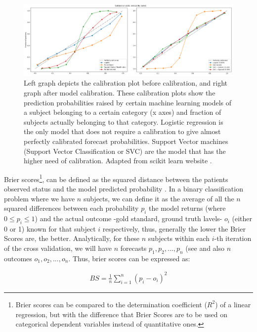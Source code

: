 \documentclass[a4paper,12pt]{elsarticle}  %
\begin{document}
\begin{figure}[h] 
	\centering	
	\includegraphics[width=\textwidth]{fig_calibration_vs_no_calibration.png}	
	\caption{Left graph depicts the calibration plot before calibration, and right graph after model calibration. These calibration plots show the prediction probabilities raised by certain machine learning models of a subject belonging to a certain category (x axes) and fraction of subjects actually belonging to that category. Logistic regression is the only model that does not require a calibration to give almost perfectly calibrated forecast probabilities. Support Vector machines (Support Vector Classification or SVC) are the model that has the higher need of calibration. Adapted from scikit learn website \cite{sklearn-calibration}.}
	\label{fig:calibration_vs_no_calibration}
\end{figure}

Brier scores\footnote{Brier scores can  be compared to the determination coefficient ($R^{2}$) of a linear regression, but with the difference that Brier Scores are to be used on categorical dependent variables instead of quantitative ones.}, can be defined as the squared distance between the patients observed status and the model predicted probability \cite{Gerds2008457}. In a binary classification problem where we have $n$ subjects, we can define it as the average of all the $n$ squared differences between each probability $p_i$ the model returns (where $0 \le p_i \le 1$) and the actual outcome -gold standard, ground truth lavels- $o_i$ (either 0 or 1) known for that subject $i$ respectively, thus, generally the lower the Brier Scores are, the better. Analytically, for these $n$ subjects within each $i$-th iteration of the cross validation, we will have $n$ forecasts $p_{1}, p_{2}, ... , p_{n}$ (see \label{study design} and also $n$ outcomes $o_{1}, o_{2}, ... , o_{n}$. Thus, brier scores can be expressed as:

\begin{align}
	BS = \frac{1}{n}\sum_{i=1}^{n} (p_i - o_i)^{2}
\end{align}
\end{document}
